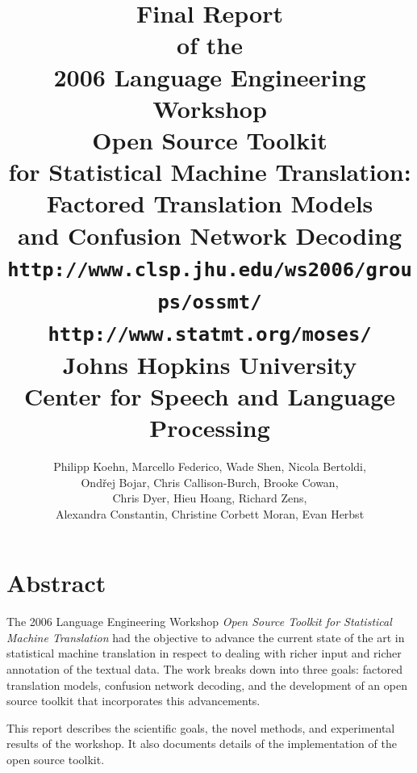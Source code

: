 \documentclass[11pt]{report}
\theoremstyle{plain}
\begin{document}
\title{\vspace{-15mm}\LARGE {\bf Final Report}\\[2mm]
of the\\[2mm]
2006 Language Engineering Workshop\\[15mm]
{\huge \bf Open Source Toolkit\\[2mm]
\bf for Statistical Machine Translation:\\[5mm]
Factored Translation Models\\[2mm]
and Confusion Network Decoding}\\[10mm]
{\tt \Large http://www.clsp.jhu.edu/ws2006/groups/ossmt/}\\[2mm]
{\tt \Large http://www.statmt.org/moses/}\\[15mm]
Johns Hopkins University\\[2mm]
Center for Speech and Language Processing}
\author{\large Philipp Koehn,
Marcello Federico,
Wade Shen,
Nicola Bertoldi,\\
\large Ond\v{r}ej Bojar,
Chris Callison-Burch,
Brooke Cowan,\\
\large Chris Dyer,
Hieu Hoang,
Richard Zens,\\
\large Alexandra Constantin,
Christine Corbett Moran,
Evan Herbst}

\maketitle
 
\section*{Abstract}
{\Large The 2006 Language Engineering Workshop {\em Open Source Toolkit for Statistical Machine Translation} had the objective to advance the current state of the art in statistical machine translation in respect to dealing with richer input and richer annotation of the textual data. The work breaks down into three goals: factored translation models, confusion network decoding, and the development of an open source toolkit that incorporates this advancements.

This report describes the scientific goals, the novel methods, and experimental results of the workshop. It also documents details of the implementation of the open source toolkit.

\phantom{.}
}

\newpage
\end{document}
